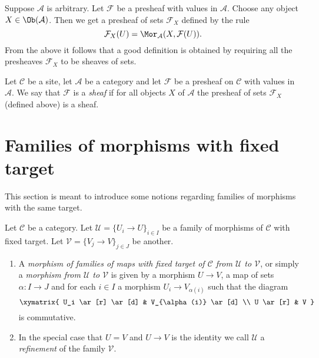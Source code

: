 \medskip\noindent
Suppose $\mathcal{A}$ is arbitrary.
Let $\mathcal{F}$ be a presheaf with values in $\mathcal{A}$.
Choose any object $X\in \Ob(\mathcal{A})$.
Then we get a presheaf of sets $\mathcal{F}_X$ defined
by the rule
$$
\mathcal{F}_X(U) = \Mor_\mathcal{A}(X, \mathcal{F}(U)).
$$
From the above it follows that a good definition is
obtained by requiring all the presheaves $\mathcal{F}_X$ to be
sheaves of sets.

\begin{definition}
\label{definition-sheaf}
Let $\mathcal{C}$ be a site, let $\mathcal{A}$ be a category
and let $\mathcal{F}$ be a presheaf on $\mathcal{C}$ with values in
$\mathcal{A}$. We say that $\mathcal{F}$ is a {\it sheaf}
if for all objects $X$ of $\mathcal{A}$ the presheaf of sets
$\mathcal{F}_X$ (defined above) is a sheaf.
\end{definition}











\section{Families of morphisms with fixed target}
\label{section-refinements}

\noindent
This section is meant to introduce some notions regarding
families of morphisms with the same target.

\begin{definition}
\label{definition-morphism-coverings}
Let $\mathcal{C}$ be a category.
Let $\mathcal{U} = \{U_i \to U\}_{i\in I}$ be a family
of morphisms of $\mathcal{C}$ with fixed target.
Let $\mathcal{V} = \{V_j \to V\}_{j\in J}$ be another.
\begin{enumerate}
\item
A {\it morphism of families of maps with fixed target
of $\mathcal{C}$ from  $\mathcal{U}$ to $\mathcal{V}$},
or simply a {\it morphism from $\mathcal{U}$ to $\mathcal{V}$}
is given by a morphism $U \to V$, a map of sets
$\alpha : I \to J$ and for each $i\in I$
a morphism $U_i \to V_{\alpha(i)}$ such that the diagram
$$
\xymatrix{
U_i \ar[r] \ar[d]
&
V_{\alpha(i)} \ar[d]
\\
U \ar[r]
&
V
}
$$
is commutative.
\item In the special case that $U = V$ and $U \to V$ is the identity
we call $\mathcal{U}$ a {\it refinement} of the family $\mathcal{V}$.
\end{enumerate}
\end{definition}

